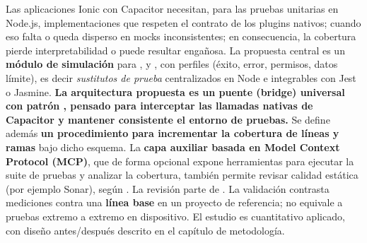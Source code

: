 Las aplicaciones Ionic con Capacitor necesitan, para las pruebas unitarias en Node.js, implementaciones que respeten el contrato de los plugins nativos; cuando eso falta o queda disperso en mocks inconsistentes; en consecuencia, la cobertura pierde interpretabilidad o puede resultar engañosa. La propuesta central es un \textbf{módulo de simulación} para ,  y , con perfiles (éxito, error, permisos, datos límite), es decir \textit{sustitutos de prueba} centralizados en Node e integrables con Jest o Jasmine. \textbf{La arquitectura propuesta es un puente (bridge) universal con patrón , pensado para interceptar las llamadas nativas de Capacitor y mantener consistente el entorno de pruebas.} Se define además \textbf{un procedimiento para incrementar la cobertura de líneas y ramas} bajo dicho esquema. La \textbf{capa auxiliar basada en Model Context Protocol (MCP)}, que de forma opcional expone herramientas para ejecutar la suite de pruebas y analizar la cobertura, también permite revisar calidad estática (por ejemplo Sonar), según \cite{mcp-spec2025}. La revisión parte de \cite{nie2023gui_mobile_mapping,schafer2024testpilot,olsthoorn2024syntest_javascript}. La validación contrasta mediciones contra una \textbf{línea base} en un proyecto de referencia; no equivale a pruebas extremo a extremo en dispositivo. El estudio es cuantitativo aplicado, con diseño antes/después descrito en el capítulo de metodología.
